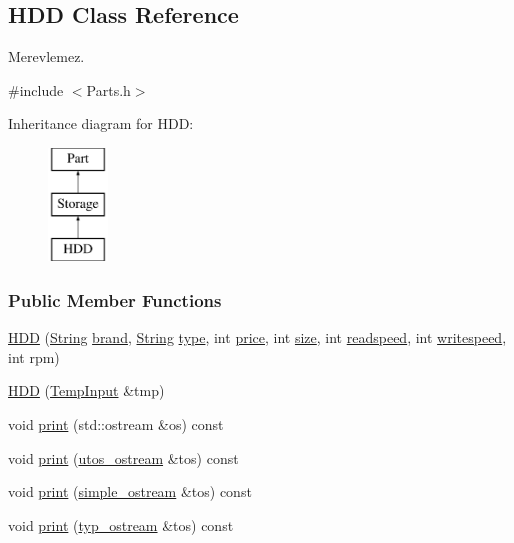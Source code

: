 \subsection{H\+DD Class Reference}
\label{class_h_d_d}


Merevlemez.  




{\ttfamily \#include $<$Parts.\+h$>$}

Inheritance diagram for H\+DD\+:\begin{figure}[H]
\begin{center}
\leavevmode
\includegraphics[height=3.000000cm]{class_h_d_d}
\end{center}
\end{figure}
\subsubsection*{Public Member Functions}
\begin{DoxyCompactItemize}
\item 
\mbox{\hyperlink{class_h_d_d_a375ad923cb64a11afc261fe1fac5276c}{H\+DD}} (\mbox{\hyperlink{class_string}{String}} \mbox{\hyperlink{class_part_ae06f2fdeb7fbbdb229a7aca151f3e341}{brand}}, \mbox{\hyperlink{class_string}{String}} \mbox{\hyperlink{class_part_a101dbcc5c4b21564df7414c7eb0eae88}{type}}, int \mbox{\hyperlink{class_part_a8e71223aed1da95a974f33d8d6c91bb1}{price}}, int \mbox{\hyperlink{class_storage_abcc80ce58a21fa884035617ee0b6cb67}{size}}, int \mbox{\hyperlink{class_storage_a41073842ff16961dad3903e6dd49bb0c}{readspeed}}, int \mbox{\hyperlink{class_storage_a0198a1483ccf849d48c76da88599ba8b}{writespeed}}, int rpm)
\item 
\mbox{\hyperlink{class_h_d_d_a74adfdcd9b7e7e1e463f6e5c442c78e0}{H\+DD}} (\mbox{\hyperlink{struct_temp_input}{Temp\+Input}} \&tmp)
\item 
void \mbox{\hyperlink{class_h_d_d_a07c34356018542934a4dd91ce38b0821}{print}} (std\+::ostream \&os) const
\item 
void \mbox{\hyperlink{class_h_d_d_aca2c2583fa3304917905cd9185b64539}{print}} (\mbox{\hyperlink{structutos__ostream}{utos\+\_\+ostream}} \&tos) const
\item 
void \mbox{\hyperlink{class_h_d_d_a0e48767713740f3ec7dafd907d3570b1}{print}} (\mbox{\hyperlink{structsimple__ostream}{simple\+\_\+ostream}} \&tos) const
\item 
void \mbox{\hyperlink{class_h_d_d_a557271f835f56a25fe5c264019f20bb2}{print}} (\mbox{\hyperlink{structtyp__ostream}{typ\+\_\+ostream}} \&tos) const
\end{DoxyCompactItemize}
